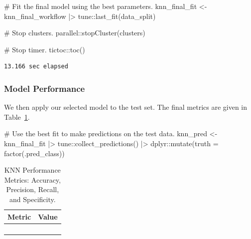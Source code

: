 \documentclass[
  letterpaper,
  DIV=11,
  numbers=noendperiod]{scrartcl}
\newenvironment{Shaded}{\begin{snugshade}}{\end{snugshade}}
\newcommand{\AttributeTok}[1]{\textcolor[rgb]{0.40,0.45,0.13}{#1}}
\newcommand{\CommentTok}[1]{\textcolor[rgb]{0.37,0.37,0.37}{#1}}
\newcommand{\FunctionTok}[1]{\textcolor[rgb]{0.28,0.35,0.67}{#1}}
\newcommand{\NormalTok}[1]{\textcolor[rgb]{0.00,0.23,0.31}{#1}}
\newcommand{\OtherTok}[1]{\textcolor[rgb]{0.00,0.23,0.31}{#1}}
\newcommand{\SpecialCharTok}[1]{\textcolor[rgb]{0.37,0.37,0.37}{#1}}
\begin{document}
\begin{Shaded}
\begin{Highlighting}[]
\CommentTok{\# Fit the final model using the best parameters.}
\NormalTok{knn\_final\_fit }\OtherTok{\textless{}{-}} 
\NormalTok{  knn\_final\_workflow }\SpecialCharTok{|\textgreater{}} 
\NormalTok{  tune}\SpecialCharTok{::}\FunctionTok{last\_fit}\NormalTok{(data\_split)}

\CommentTok{\# Stop clusters.}
\NormalTok{parallel}\SpecialCharTok{::}\FunctionTok{stopCluster}\NormalTok{(clusters)}

\CommentTok{\# Stop timer.}
\NormalTok{tictoc}\SpecialCharTok{::}\FunctionTok{toc}\NormalTok{()}
\end{Highlighting}
\end{Shaded}

\begin{verbatim}
13.166 sec elapsed
\end{verbatim}

\subsubsection{Model Performance}\label{model-performance}

We then apply our selected model to the test set. The final metrics are
given in Table~\ref{tbl-knn-performance}.

\begin{Shaded}
\begin{Highlighting}[]
\CommentTok{\# Use the best fit to make predictions on the test data.}
\NormalTok{knn\_pred }\OtherTok{\textless{}{-}} 
\NormalTok{  knn\_final\_fit }\SpecialCharTok{|\textgreater{}} 
\NormalTok{  tune}\SpecialCharTok{::}\FunctionTok{collect\_predictions}\NormalTok{() }\SpecialCharTok{|\textgreater{}}
\NormalTok{  dplyr}\SpecialCharTok{::}\FunctionTok{mutate}\NormalTok{(}\AttributeTok{truth =} \FunctionTok{factor}\NormalTok{(.pred\_class))}
\end{Highlighting}
\end{Shaded}

\begin{longtable}{>{\raggedright\arraybackslash}p{}>{\raggedleft\arraybackslash}p{}}

\caption{\label{tbl-knn-performance}KNN Performance Metrics: Accuracy,
Precision, Recall, and Specificity.}

\tabularnewline

\toprule
Metric & Value \\ 
\midrule\addlinespace[2.5pt]
\cellcolor[HTML]{FFFFFF}{Accuracy} & \cellcolor[HTML]{FFFFFF}{90.1} \\ 
\cellcolor[HTML]{FFFFFF}{Precision} & \cellcolor[HTML]{FFFFFF}{76.9} \\ 
\cellcolor[HTML]{FFFFFF}{Recall} & \cellcolor[HTML]{FFFFFF}{87.0} \\ 
\cellcolor[HTML]{FFFFFF}{Specificity} & \cellcolor[HTML]{FFFFFF}{91.2} \\ 
\bottomrule

\end{longtable}
\end{document}
